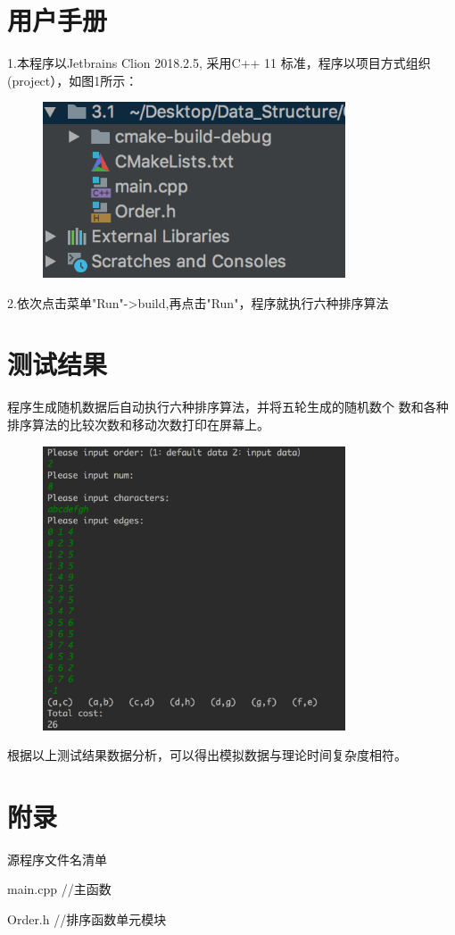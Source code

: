 \documentclass[paper=a4,UTF8,fontsize=11pt]{scrartcl} %
\numberwithin{equation}{section} %
\numberwithin{figure}{section} %
\numberwithin{table}{section} %
\begin{document}
\section{用户手册}
1.本程序以Jetbrains Clion 2018.2.5, 采用C++ 11 标准，程序以项目方式组织(project），如图1所示：
\begin{figure}[h]
    \centering
    \includegraphics[width=0.8\textwidth]{project31.png}
\end{figure}

2.依次点击菜单"Run"->build,再点击"Run"，程序就执行六种排序算法

\section{测试结果}

程序生成随机数据后自动执行六种排序算法，并将五轮生成的随机数个
数和各种排序算法的比较次数和移动次数打印在屏幕上。
\begin{figure}[h]
    \centering
    \includegraphics[width=0.8\textwidth]{result.png}
\end{figure}

	根据以上测试结果数据分析，可以得出模拟数据与理论时间复杂度相符。

\section{附录}

源程序文件名清单

main.cpp               \qquad \quad  //主函数

Order.h            \qquad \qquad //排序函数单元模块
\end{document}
